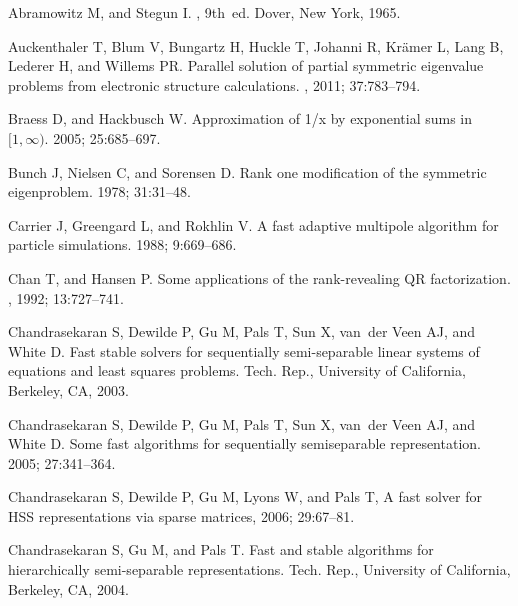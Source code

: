 \documentclass[times]{nlaauth}
\newcounter{algorithm}
\begin{document}
\begin{thebibliography}{99}

{ Abramowitz M, and Stegun I.}
, 9th~ed.
\newblock Dover, New York, 1965.

{  Auckenthaler T, Blum V, Bungartz H, Huckle T, Johanni R,
  Kr\"{a}mer L, Lang B, Lederer H, and Willems PR.}
\newblock Parallel solution of partial symmetric eigenvalue problems from
  electronic structure calculations.
, 2011; 37:783--794.



{  Braess D, and Hackbusch W.}
\newblock Approximation of 1/x by exponential sums in $[1,\infty)$.
 2005; 25:685--697.

{  Bunch J, Nielsen C, and Sorensen D.}
\newblock Rank one modification of the symmetric eigenproblem.
 1978; 31:31--48.

{  Carrier J, Greengard L, and Rokhlin V.}
\newblock A fast adaptive multipole algorithm for particle simulations.
 1988; 9:669--686.

{  Chan T, and Hansen P.}
\newblock Some applications of the rank-revealing {QR} factorization.
, 1992; 13:727--741.

{  Chandrasekaran S, Dewilde P, Gu M, Pals T, Sun X, van~der Veen
  AJ, and White D.}
\newblock Fast stable solvers for sequentially semi-separable linear systems of
  equations and least squares problems.
\newblock Tech. Rep., University of California, Berkeley, CA, 2003.

{  Chandrasekaran S, Dewilde P, Gu M, Pals T, Sun X, van~der Veen
  AJ, and White D.}
\newblock Some fast algorithms for sequentially semiseparable representation.
 2005; 27:341--364.

{Chandrasekaran S, Dewilde P, Gu M, Lyons W, and Pals T},
\newblock A fast solver for {HSS} representations via sparse matrices,
 2006; 29:67--81.

{  Chandrasekaran S, Gu M, and Pals T.}
\newblock Fast and stable algorithms for hierarchically semi-separable
  representations.
\newblock Tech. Rep., University of California, Berkeley, CA, 2004.


\end{thebibliography}
\end{document}
